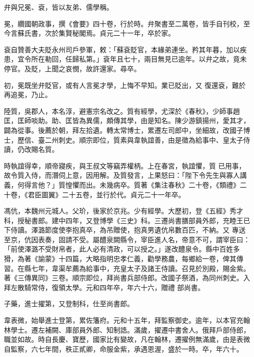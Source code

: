 \begin{pinyinscope}
 弁與兄冕、袞，皆以友弟、儒學稱。



 冕，纘國朝政事，撰《會要》四十卷，行於時。弁聚書至二萬卷，皆手自刊校，至今言蘇氏書，次於集賢秘閣焉。貞元二十一年，卒於家。



 袞自贊善大夫貶永州司戶參軍，敕：「蘇袞貶官，本緣弟連坐。矜其年暮，加以疾患，宜令所在勒回，任歸私第。」袞年且七十，兩目無見已逾年。以弁之故，竟未停官。及貶，上聞之哀憫，故許還家。尋卒。



 初，冕既坐弁貶官，或有人言冕才學，上悔不早知。業已貶出，又
 復還袞，難於再追冕，乃止。



 陸質，吳郡人，本名淳，避憲宗名改之。質有經學，尤深於《春秋》，少師事趙匡，匡師啖助。助、匡皆為異儒，頗傳其學，由是知名。陳少游鎮揚州，愛其才，闢為從事。後薦於朝，拜左拾遺。轉太常博士，累遷左司郎中，坐細故，改國子博士，歷信、臺二州刺史。順宗即位，質素與韋執誼善，由是徵為給事中、皇太子侍讀，仍改賜名質。



 時執誼得幸，順帝寢疾，與王叔文等竊弄權柄。上在春宮，執誼懼，質
 已用事，故令質入侍，而潛伺上意，因用解。及質發言，上果怒曰：「陛下令先生與寡人講義，何得言他？」質惶懼而出。未幾病卒。質著《集注春秋》二十卷，《類禮》二十卷，《君臣圖翼》二十五卷，並行於代。貞元二十一年卒。



 馮伉，本魏州元城人。父玠，後家於京兆。少有經學。大歷初，登《五經》秀才科，授秘書郎。建中四年，又登博學《三史》科。三遷尚書膳部員外郎，充睦王已下侍讀。澤潞節度使李抱真卒，為吊贈使，抱真男遺伉帛數百匹，不納。又
 專送至京，伉因表奏，固請不受。屬醴泉闕縣令，宰臣進人名，帝意不可，謂宰臣曰：「前使澤潞不受財帛者，此人必有清政，可以授之。」遂改醴泉令。縣中百姓多猾，為著《諭蒙》十四篇，大略指明忠孝仁義，勸學務農，每鄉給一卷，俾其傳習。在縣七年，韋渠牟薦為給事中，充皇太子及諸王侍讀。召見於別殿，賜金紫。著《三傳異同》三卷。順宗即位，拜尚書兵部侍郎。改國子祭酒，為同州刺史。入拜左散騎常侍，復領太學。元和四年卒，年六十六，贈禮
 部尚書。



 子藥，進士擢第，又登制科，仕至尚書郎。



 韋表微，始舉進士登第，累佐籓府。元和十五年，拜監察御史。逾年，以本官充翰林學士。遷左補闕、庫部員外郎、知制誥。滿歲，擢遷中書舍人。俄拜戶部侍郎，職並如故。時自長慶、寶歷，國家比有變故，凡在翰林，遷擢例無滿歲，由是表微自監察，六七年間，秩正貳卿，命服金紫，承遇恩渥，盛於一時。卒，年六十。




\end{pinyinscope}
